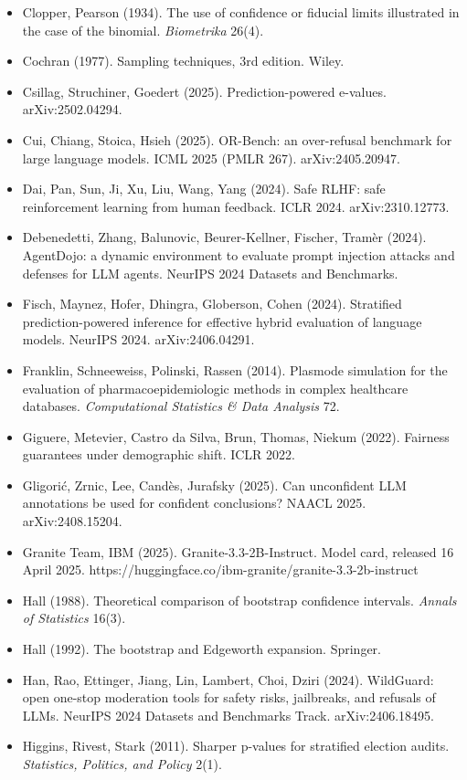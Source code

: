 \documentclass[11pt]{article}
\begin{document}
\begin{itemize}
\item Clopper, Pearson (1934). The use of confidence or fiducial limits illustrated in the case of the binomial. \emph{Biometrika} 26(4).
\item Cochran (1977). Sampling techniques, 3rd edition. Wiley.
\item Csillag, Struchiner, Goedert (2025). Prediction-powered e-values. arXiv:2502.04294.
\item Cui, Chiang, Stoica, Hsieh (2025). OR-Bench: an over-refusal benchmark for large language models. ICML 2025 (PMLR 267). arXiv:2405.20947.
\item Dai, Pan, Sun, Ji, Xu, Liu, Wang, Yang (2024). Safe RLHF: safe reinforcement learning from human feedback. ICLR 2024. arXiv:2310.12773.
\item Debenedetti, Zhang, Balunovic, Beurer-Kellner, Fischer, Tramèr (2024). AgentDojo: a dynamic environment to evaluate prompt injection attacks and defenses for LLM agents. NeurIPS 2024 Datasets and Benchmarks.
\item Fisch, Maynez, Hofer, Dhingra, Globerson, Cohen (2024). Stratified prediction-powered inference for effective hybrid evaluation of language models. NeurIPS 2024. arXiv:2406.04291.
\item Franklin, Schneeweiss, Polinski, Rassen (2014). Plasmode simulation for the evaluation of pharmacoepidemiologic methods in complex healthcare databases. \emph{Computational Statistics \& Data Analysis} 72.
\item Giguere, Metevier, Castro da Silva, Brun, Thomas, Niekum (2022). Fairness guarantees under demographic shift. ICLR 2022.
\item Gligorić, Zrnic, Lee, Candès, Jurafsky (2025). Can unconfident LLM annotations be used for confident conclusions? NAACL 2025. arXiv:2408.15204.
\item Granite Team, IBM (2025). Granite-3.3-2B-Instruct. Model card, released 16 April 2025. https://huggingface.co/ibm-granite/granite-3.3-2b-instruct
\item Hall (1988). Theoretical comparison of bootstrap confidence intervals. \emph{Annals of Statistics} 16(3).
\item Hall (1992). The bootstrap and Edgeworth expansion. Springer.
\item Han, Rao, Ettinger, Jiang, Lin, Lambert, Choi, Dziri (2024). WildGuard: open one-stop moderation tools for safety risks, jailbreaks, and refusals of LLMs. NeurIPS 2024 Datasets and Benchmarks Track. arXiv:2406.18495.
\item Higgins, Rivest, Stark (2011). Sharper p-values for stratified election audits. \emph{Statistics, Politics, and Policy} 2(1).

\end{itemize}
\end{document}
